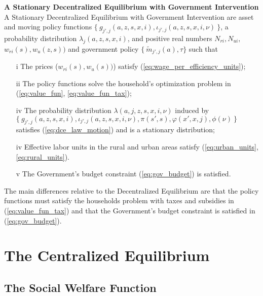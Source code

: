 \documentclass[12pt,pdftex]{article}
\begin{document}
\begin{onehalfspacing}
\textbf{A Stationary Decentralized Equilibrium with Government Intervention} A Stationary Decentralized Equilibrium with Government Intervention are asset and moving policy functions $\{\ g_{j',j}(a, z, s, x, i), \iota_{j',j}(a, z, s, x, i, \nu) \ \}$, a probability distribution $\lambda_{j}(a, z, s, x, i)$, and positive real numbers $N_{ri}, N_{ui},$ $w_{ri}(s), w_{u}(z, s))$ and government policy $\{\ \tilde{m}_{j',j}(a), \tau\}$ such that
\begin{itemize}
\vspace{-.4cm}
\item[i] The prices ($w_{ri}(s), w_{u}(s))$) satisfy (\ref{eq:wage_per_efficiency_units});
\item[ii] The policy functions solve the household's optimization problem in (\ref{eq:value_fun}, \ref{eq:value_fun_tax});
\item[iv] The probability distribution $\lambda(a, j, z, s, x, i, \nu)$ induced by \\
$\{\ g_{j',j}(a, z, s, x, i), \iota_{j',j}(a, z, s, x, i, \nu), \pi(s',s), \varphi(x',x,j), \phi(\nu) \ \}$ satisfies (\ref{eq:dce_law_motion}) and is a stationary distribution;
\item[iv] Effective labor units in the rural and urban areas satisfy (\ref{eq:urban_units}, \ref{eq:rural_units}).
\item[v] The Government's budget constraint (\ref{eq:gov_budget}) is satisfied.
\end{itemize}
The main differences relative to the Decentralized Equilibrium are that the policy functions must satisfy the households problem with taxes and subsidies in (\ref{eq:value_fun_tax}) and that the Government's budget constraint is satisfied in (\ref{eq:gov_budget}).

\section{The Centralized Equilibrium}

\subsection{The Social Welfare Function}


\end{onehalfspacing}
\end{document}
